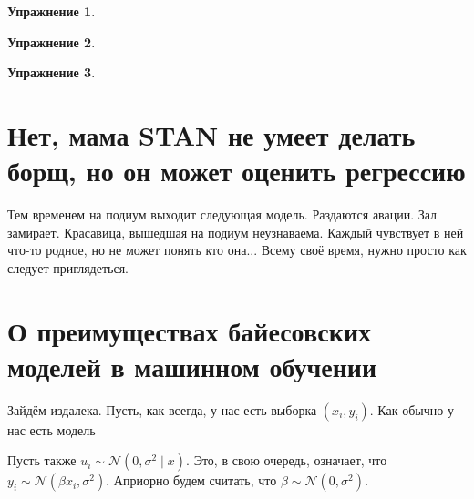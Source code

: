 \documentclass[12pt, a4paper, oneside]{extreport}
\def \b{\beta}
\def \mN{\mathcal{N}}
\theoremstyle{plain}              %
\theoremstyle{definition}         %
\newtheorem{problem}{\color{myblue} Упражнение}
\begin{document}
\begin{problem}
	
	
	\begin{sol} 
		
		
	\end{sol} 
\end{problem}


\begin{problem}
	
	
	\begin{sol} 
		
		
	\end{sol} 
\end{problem}


\begin{problem}
	
	
	\begin{sol} 
		
		
	\end{sol} 
\end{problem}




















\section{Нет,  мама STAN не умеет делать борщ, но он может оценить регрессию} 


Тем временем на подиум выходит следующая модель. Раздаются авации. Зал замирает. Красавица, вышедшая на подиум неузнаваема. Каждый чувствует в ней что-то родное, но не может понять кто она... Всему своё время, нужно просто как следует приглядеться. 

\section{О преимуществах байесовских моделей в машинном обучении}

Зайдём издалека. Пусть, как всегда, у нас есть выборка $(x_i, y_i)$. Как обычно у нас есть модель 


Пусть также $u_i \sim \mN(0, \sigma^2 \mid x)$. Это, в свою очередь, означает, что $y_i \sim \mN(\beta x_i, \sigma^2)$. Априорно будем считать, что $\b \sim \mN(0, \sigma^2)$.
\end{document}
